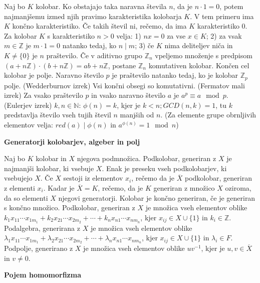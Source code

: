 \documentclass[10pt]{extarticle}
\begin{document}
        
             Naj bo $K$ kolobar. Ko obstajajo taka naravna števila $n$, da je $n\cdot 1=0$, potem najmanjšemu izmed njih pravimo karakteristika kolobarja $K$. V tem primeru ima $K$ končno karakteristiko. Če takih števil ni, rečemo, da ima $K$ karakteristiko $0$.
             Za kolobar $K$ s karakteristiko $n>0$ velja: 1) $nx=0$ za vse $x\in K$; 2) za vsak $m\in\mathbb{Z}$ je $m\cdot 1=0$ natanko tedaj, ko $n\mid m$; 3) če $K$ nima deliteljev niča in $K\neq\{0\}$ je $n$ praštevilo.
             Če v aditivno grupo $\mathbb{Z}_n$ vpeljemo množenje s predpisom $(a+n\mathbb{Z})\cdot(b+n\mathbb{Z})=ab+n\mathbb{Z}$, postane $\mathbb{Z}_n$ komutativen kolobar.
             Končen cel kolobar je polje.
             Naravno število $p$ je praštevilo natanko tedaj, ko je kolobar $\mathbb{Z}_p$ polje.
             (Wedderburnov izrek) Vsi končni obsegi so komutativni.
             (Fermatov mali izrek) Za vsako praštevilo $p$ in vsako naravno število $a$ je $a^p\equiv a\mod{p}$.
             (Eulerjev izrek) $k,n\in \mathbb{N}$: $\phi(n)=k$, kjer je $k<n; GCD(n,k)=1$, tu $k$ predstavlja število vseh tujih števil $n$ manjših od $n$. (Za elemente grupe obrnljivih elementov velja: $red(a)\mid\phi(n)$ in $a^{\phi(n)}=1\mod{n}$)


    \textbf{Generatorji kolobarjev, algeber in polj}

        
             Naj bo $K$ kolobar in $X$ njegova podmnožica. Podkolobar, generiran z $X$ je najmanjši kolobar, ki vsebuje $X$. Enak je preseku vseh podkolobarjev, ki  vsebujejo $X$. Če $X$ sestoji iz elementov $x_i$, rečemo da je $\overline{X}$ podkolobar, generiran z elementi $x_i$. Kadar je $\overline{X}=K$, rečemo, da je $K$ generiran z množico $X$ oziroma, da so elementi $X$ njegovi generatorji. Kolobar je končno generiran, če je generiran s končno množico.
             Podkolobar, generiran z $X$ je množica vseh elementov oblike $k_1x_{11}\cdots x_{1m_1}+k_2x_{21}\cdots x_{2m_2}+\cdots+k_nx_{n1}\cdots x_{nm_n}$, kjer $x_{ij}\in X\cup\{1\}$ in $k_i\in\mathbb{Z}$.
             Podalgebra, generirana z $X$ je množica vseh elementov oblike $\lambda_1x_{11}\cdots x_{1m_1}+\lambda_2x_{21}\cdots x_{2m_2}+\cdots+\lambda_nx_{n1}\cdots x_{nm_n}$, kjer $x_{ij}\in X\cup\{1\}$ in $\lambda_i\in F$.
             Podpolje, generirano z $X$ je množica vseh elementov oblike $uv^{-1}$, kjer je $u,v\in\overline{X}$ in $v\neq 0$.


    \textbf{Pojem homomorfizma}
\end{document}

